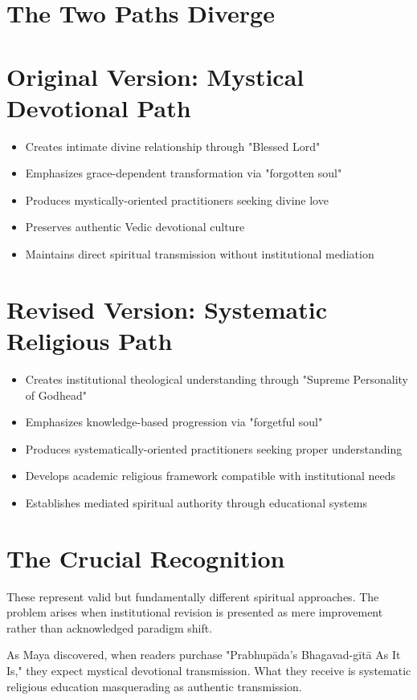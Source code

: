 \documentclass[11pt,twoside]{book}
\begin{document}
\section*{The Two Paths Diverge}
\label{sec:org9de7d3e}

\section*{Original Version: Mystical Devotional Path}
\label{sec:org6d4d7ea}
\begin{itemize}
\item Creates intimate divine relationship through "Blessed Lord"
\item Emphasizes grace-dependent transformation via "forgotten soul"
\item Produces mystically-oriented practitioners seeking divine love
\item Preserves authentic Vedic devotional culture
\item Maintains direct spiritual transmission without institutional mediation
\end{itemize}
\section*{Revised Version: Systematic Religious Path}
\label{sec:orgd240a6d}
\begin{itemize}
\item Creates institutional theological understanding through "Supreme Personality of Godhead"
\item Emphasizes knowledge-based progression via "forgetful soul"
\item Produces systematically-oriented practitioners seeking proper understanding
\item Develops academic religious framework compatible with institutional needs
\item Establishes mediated spiritual authority through educational systems
\end{itemize}
\section*{The Crucial Recognition}
\label{sec:orgd8b40f4}

These represent valid but fundamentally different spiritual approaches. The problem arises when institutional revision is presented as mere improvement rather than acknowledged paradigm shift.

As Maya discovered, when readers purchase "Prabhupāda's Bhagavad-gītā As It Is," they expect mystical devotional transmission. What they receive is systematic religious education masquerading as authentic transmission.
\end{document}
